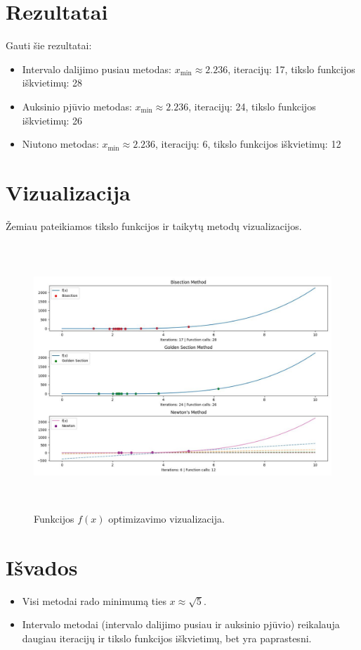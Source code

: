 \documentclass[lithuanian,a4paper,12pt]{article}
\begin{document}
\section{Rezultatai}
Gauti šie rezultatai:
\begin{itemize}
    \item Intervalo dalijimo pusiau metodas: 
        $x_{\min} \approx 2.236$, iteracijų: 17, tikslo funkcijos iškvietimų: 28
    \item Auksinio pjūvio metodas:
        $x_{\min} \approx 2.236$, iteracijų: 24, tikslo funkcijos iškvietimų: 26
    \item Niutono metodas:
        $x_{\min} \approx 2.236$, iteracijų: 6, tikslo funkcijos iškvietimų: 12
\end{itemize}

\section{Vizualizacija}
Žemiau pateikiamos tikslo funkcijos ir taikytų metodų vizualizacijos.
\begin{figure}[H]
    \centering
    \includegraphics[width=\textwidth,height=10cm]{figure-1.jpeg}
    \caption{\label{fig:all}Funkcijos $f(x)$ optimizavimo vizualizacija.}
\end{figure}

\section{Išvados}
\begin{itemize}
    \item Visi metodai rado minimumą ties $x \approx \sqrt{5}$.
    \item Intervalo metodai (intervalo dalijimo pusiau ir auksinio pjūvio) reikalauja daugiau iteracijų ir tikslo funkcijos iškvietimų, bet yra paprastesni.
\end{itemize}
\end{document}
